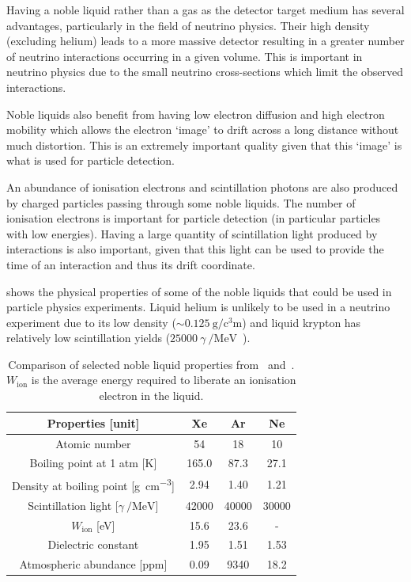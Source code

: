 Having a noble liquid rather than a gas as the detector target medium has several advantages, particularly in the field of neutrino physics.
Their high density (excluding helium) leads to a more massive detector resulting in a greater number of neutrino interactions occurring in a given volume.
This is important in neutrino physics due to the small neutrino cross-sections which limit the observed interactions.

Noble liquids also benefit from having low electron diffusion and high electron mobility which allows the electron `image' to drift across a long distance without much distortion.
This is an extremely important quality given that this `image' is what is used for particle detection.

An abundance of ionisation electrons and scintillation photons are also produced by charged particles passing through some noble liquids.
The number of ionisation electrons is important for particle detection (in particular particles with low energies).
Having a large quantity of scintillation light produced by interactions is also important, given that this light can be used to provide the time of an interaction and thus its drift coordinate.

 shows the physical properties of some of the noble liquids that could be used in particle physics experiments.
Liquid helium is unlikely to be used in a neutrino experiment due to its low density ($\sim \SI{0.125}{\gram\per\cubic\centi\metre}$) and liquid krypton has relatively low scintillation yields ($25000~\gamma~\si{\per\mega\electronvolt}$~\cite{uBooneProp}).

\begin{table}
  \caption[Comparison of selected noble liquid properties.]{Comparison of selected noble liquid properties from~\cite{uBooneProp} and~\cite{nobleLiquids}. $W_{\text{ion}}$ is the average energy required to liberate an ionisation electron in the liquid.}
  \label{tab:nobleLiquids}
  \centering
  \begin{tabular}{c c c c}
  	\hline
    \hline
    \textbf{Properties [unit]} & \textbf{Xe} & \textbf{Ar} & \textbf{Ne} \\
    \hline
    Atomic number & 54 & 18 & 10 \\
    Boiling point at 1 atm [K] & 165.0 & 87.3 & 27.1 \\
    Density at boiling point [\si{\gram\per\cubic\centi\metre}] & 2.94 & 1.40 & 1.21 \\
    Scintillation light [$\gamma~\si{\per\mega\electronvolt}$] & \num{42000} & \num{40000} & \num{30000} \\
    $W_{\text{ion}}$ [\si{\electronvolt}] & 15.6 & 23.6 & - \\
    Dielectric constant & 1.95 & 1.51 & 1.53 \\
    Atmospheric abundance [ppm] & 0.09 & \num{9340} & 18.2 \\
    \hline
  \end{tabular}
\end{table}

